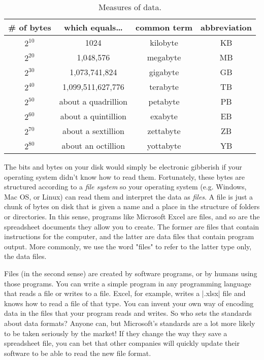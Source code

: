 \documentclass[11pt]{book}
\newcommand{\term}[1]{\emph{#1}} %
\newcommand{\head}[1]{\textnormal{\textbf{#1}}} %
\begin{document}
\begin{table}
\centering
\caption{Measures of data.}\label{tab:kilomega}
\vspace{10pt}
\begin{tabular}{cccc}
    \toprule[1.5pt]
    \head{\# of bytes} & \head{which equals\ldots} & \head{common term} & \head{abbreviation}\\
    \midrule
    $2^{10}$ & 1024 & kilobyte & KB\\
    $2^{20}$ & 1,048,576 & megabyte & MB\\
    $2^{30}$ & 1,073,741,824 & gigabyte & GB\\
    $2^{40}$ & 1,099,511,627,776 & terabyte & TB\\
    $2^{50}$ & about a quadrillion & petabyte & PB\\
    $2^{60}$ & about a quintillion & exabyte & EB\\
    $2^{70}$ & about a sextillion & zettabyte & ZB\\
    $2^{80}$ & about an octillion & yottabyte & YB\\
    \bottomrule[1.5pt]
\end{tabular}
\end{table}

The bits and bytes on your disk would simply be electronic gibberish if your operating system didn't know how to read them.  Fortunately, these bytes are structured according to a \term{file system} so your operating system (e.g. Windows, Mac OS, or Linux) can read them and interpret the data as \term{files}.  A file is just a chunk of bytes on disk that is given a name and a place in the structure of folders or directories.  In this sense, programs like Microsoft Excel are files, and so are the spreadsheet documents they allow you to create.  The former are files that contain instructions for the computer, and the latter are data files that contain program output.  More commonly, we use the word "files" to refer to the latter type only, the data files.

Files (in the second sense) are created by software programs, or by humans using those programs.  You can write a simple program in any programming language that reads a file or writes to a file.  Excel, for example, writes a |.xlsx| file and knows how to read a file of that type.  You can invent your own way of encoding data in the files that your program reads and writes.  So who sets the standards about data formats?  Anyone can, but Microsoft's standards are a lot more likely to be taken seriously by the market!  If they change the way they save a spreadsheet file, you can bet that other companies will quickly update their software to be able to read the new file format. 
\end{document}
